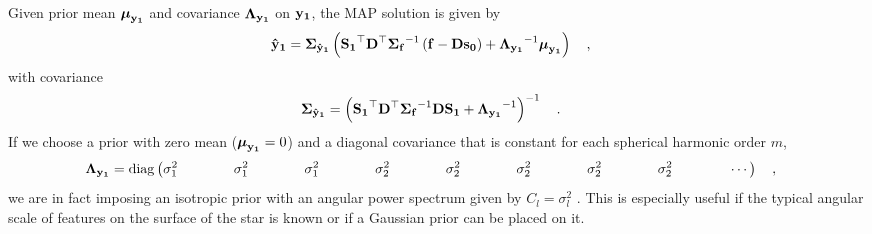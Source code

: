 \documentclass[modern]{aastex631}
\begin{document}
Given prior mean $\boldsymbol{\mu}_{\mathbf{y_1}}$ and covariance $\boldsymbol{\Lambda}_{\mathbf{y_1}}$ on ${\mathbf{y_1}}$, the MAP solution is given by
%
\begin{align}
    \label{eq:inverse:y1hat}
    {\ensuremath{\mathbf{\hat{y}_1}}} & =
    \boldsymbol{\Sigma}_\mathbf{\hat{y}_1}
    \left(
    {\mathbf{S_1}}^\top{\ensuremath{\mathbf{D}}}^\top
    {\boldsymbol{\Sigma}_\mathbf{f}}^{-1}
    \left({\mathbf{f}} - {\mathbf{D}}{\mathbf{s}}_{\mathbf{0}}\right)
    +
    {\boldsymbol{\Lambda}_{\mathbf{y_1}}}^{-1} \boldsymbol{\mu}_{\mathbf{y_1}}
    \right)
    \quad,
\end{align}
%
with covariance
%
\begin{align}
    \label{eq:inverse:y1cov}
    \boldsymbol{\Sigma}_{\mathbf{\hat{y}_1}} & =
    \left(
    {\mathbf{S_1}}^\top{\ensuremath{\mathbf{D}}}^\top
    {\boldsymbol{\Sigma}_{\ensuremath{\mathbf{f}}}}^{-1}
    {\mathbf{D}}{\mathbf{S_1}}
    +
    {\boldsymbol{\Lambda}_{\mathbf{y_1}}}^{-1}
    \right)^{-1}
    \quad.
\end{align}
%
If we choose a prior with zero mean ($\boldsymbol{\mu}_{\mathbf{y_1}} = 0$)
and a diagonal covariance that is constant for each spherical harmonic order $m$,
%
\begin{align}
    \boldsymbol{\Lambda}_{\mathbf{y_1}} & =
    \mathrm{diag} \left(
    \sigma_1^2
    \quad\quad\quad\quad
    \sigma_1^2
    \quad\quad\quad\quad
    \sigma_1^2
    \quad\quad\quad\quad
    \sigma_2^2
    \quad\quad\quad\quad
    \sigma_2^2
    \quad\quad\quad\quad
    \sigma_2^2
    \quad\quad\quad\quad
    \sigma_2^2
    \quad\quad\quad\quad
    \sigma_2^2
    \quad\quad\quad\quad
    \cdots
    \right)
    \quad,
\end{align}
%
we are in fact imposing an isotropic prior with an angular power spectrum given by $C_l = \sigma_l^2$
\citep[e.g.,][]{Baldi2006}. 
This is especially useful if the typical angular scale of features on the surface of the star is known or if a Gaussian prior can be placed on it.
\end{document}
